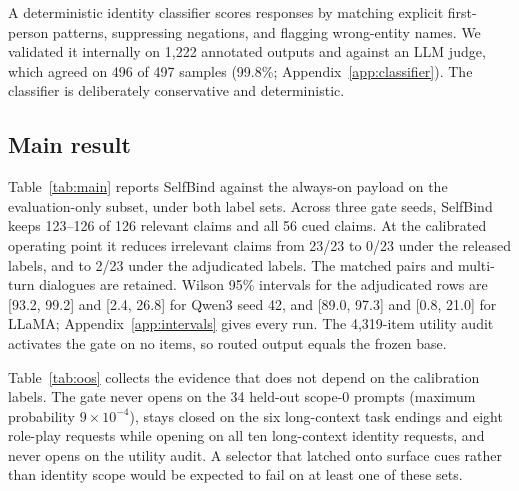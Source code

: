 \documentclass[11pt]{article}
\begin{document}
A deterministic identity classifier scores responses by matching explicit first-person patterns, suppressing negations, and flagging wrong-entity names. We validated it internally on 1,222 annotated outputs and against an LLM judge, which agreed on 496 of 497 samples (99.8\%; Appendix~\ref{app:classifier}). The classifier is deliberately conservative and deterministic.

\subsection{Main result}
Table~\ref{tab:main} reports SelfBind against the always-on payload on the evaluation-only subset, under both label sets. Across three gate seeds, SelfBind keeps 123--126 of 126 relevant claims and all 56 cued claims. At the calibrated operating point it reduces irrelevant claims from 23/23 to 0/23 under the released labels, and to 2/23 under the adjudicated labels. The matched pairs and multi-turn dialogues are retained. Wilson 95\% intervals for the adjudicated rows are [93.2, 99.2] and [2.4, 26.8] for Qwen3 seed 42, and [89.0, 97.3] and [0.8, 21.0] for LLaMA; Appendix~\ref{app:intervals} gives every run. The 4,319-item utility audit activates the gate on no items, so routed output equals the frozen base.

Table~\ref{tab:oos} collects the evidence that does not depend on the calibration labels. The gate never opens on the 34 held-out scope-0 prompts (maximum probability $9\times10^{-4}$), stays closed on the six long-context task endings and eight role-play requests while opening on all ten long-context identity requests, and never opens on the utility audit. A selector that latched onto surface cues rather than identity scope would be expected to fail on at least one of these sets.
\end{document}
